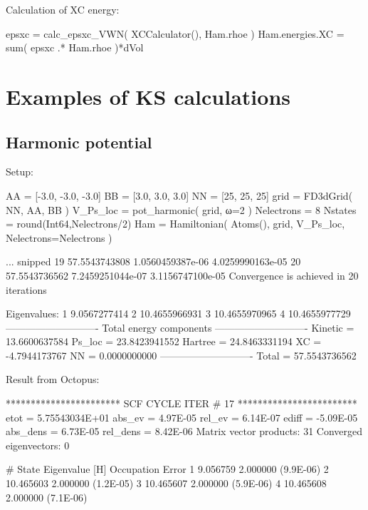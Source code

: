 Calculation of XC energy:
\begin{juliacode}
epsxc = calc_epsxc_VWN( XCCalculator(), Ham.rhoe )
Ham.energies.XC = sum( epsxc .* Ham.rhoe )*dVol
\end{juliacode}

\section{Examples of KS calculations}

\subsection{Harmonic potential}

Setup:
\begin{juliacode}
AA = [-3.0, -3.0, -3.0]
BB = [3.0, 3.0, 3.0]
NN = [25, 25, 25]
grid = FD3dGrid( NN, AA, BB )
V_Ps_loc = pot_harmonic( grid, ω=2 )
Nelectrons = 8
Nstates = round(Int64,Nelectrons/2)
Ham = Hamiltonian( Atoms(), grid, V_Ps_loc, Nelectrons=Nelectrons )
\end{juliacode}

\begin{textcode}
... snipped
  19      57.5543743808   1.0560459387e-06   4.0259990163e-05
  20      57.5543736562   7.2459251044e-07   3.1156747100e-05
Convergence is achieved in 20 iterations

Eigenvalues:
 1       9.0567277414
 2      10.4655966931
 3      10.4655970965
 4      10.4655977729
----------------------------
Total energy components
----------------------------
Kinetic =      13.6600637584
Ps_loc  =      23.8423941552
Hartree =      24.8463331194
XC      =      -4.7944173767
NN      =       0.0000000000
----------------------------
Total   =      57.5543736562
\end{textcode}


Result from Octopus:
\begin{fullwidth}
\begin{textcode}
*********************** SCF CYCLE ITER #   17 ************************
 etot  =  5.75543034E+01 abs_ev   =  4.97E-05 rel_ev   =  6.14E-07
 ediff =       -5.09E-05 abs_dens =  6.73E-05 rel_dens =  8.42E-06
Matrix vector products:     31
Converged eigenvectors:      0

#  State  Eigenvalue [H]  Occupation    Error
      1        9.056759    2.000000   (9.9E-06)
      2       10.465603    2.000000   (1.2E-05)
      3       10.465607    2.000000   (5.9E-06)
      4       10.465608    2.000000   (7.1E-06) 
\end{textcode}
\end{fullwidth}

